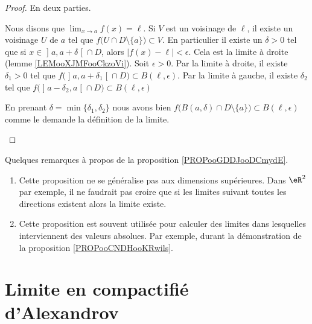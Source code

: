 \begin{proof}
	En deux parties.
	\begin{subproof}
		\spitem[\( \Rightarrow\)]
		Nous disons que \( \lim_{x\to a} f(x)=\ell\). Si \( V\) est un voisinage de \( \ell\), il existe un voisinage \( U\) de \( a\) tel que \( f\big( U\cap D\setminus \{ a \} \big)\subset V\). En particulier il existe un \( \delta>0\) tel que si \( x\in \mathopen] a , a+\delta \mathclose[\cap D\), alors \( | f(x)-\ell |<\epsilon\). Cela est la limite à droite (lemme \ref{LEMooXJMFooCkzoVi}).
		\spitem[\( \Leftarrow\)]
		Soit \( \epsilon>0\). Par la limite à droite, il existe \( \delta_1>0\) tel que \( f\big( \mathopen] a , a+\delta_1 \mathclose[\cap D \big)\subset B(\ell,\epsilon)\). Par la limite à gauche, il existe \( \delta_2\) tel que \( f\big( \mathopen] a-\delta_2 , a \mathclose[\cap D \big)\subset B(\ell,\epsilon)\)

		En prenant \( \delta=\min\{ \delta_1,\delta_2 \}\) nous avons bien \( f\big( B(a,\delta)\cap D\setminus\{ a \} \big)\subset B(\ell,\epsilon)\) comme le demande la définition de la limite.
	\end{subproof}
\end{proof}

\begin{normaltext}
	Quelques remarques à propos de la proposition \ref{PROPooGDDJooDCmydE}.
	\begin{enumerate}
		\item
		      Cette proposition ne se généralise pas aux dimensions supérieures. Dans \( \eR^2\) par exemple, il ne faudrait pas croire que si les limites suivant toutes les directions existent alors la limite existe.
		\item
		      Cette proposition est souvent utilisée pour calculer des limites dans lesquelles interviennent des valeurs absolues. Par exemple, durant la démonstration de la proposition \ref{PROPooCNDHooKRwils}.
	\end{enumerate}
\end{normaltext}

\section{Limite en compactifié d'Alexandrov}

